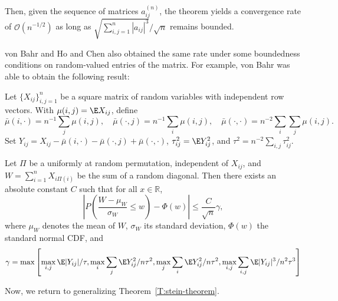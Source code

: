 Then, given the sequence of matrices $a_{ij}^{(n)}$, the theorem
yields a convergence rate of $\mathcal{O}(n^{-1/2})$ as long as
$\sqrt{\sum_{i, j = 1}^{n} |a_{ij}|^3} / \sqrt{n}$ remains bounded.

von Bahr \cite{bahr1976remainder} and Ho and Chen \cite{ho1978l_p}
also obtained the same rate under some boundedness conditions
on random-valued entries of the matrix.  For example, von
Bahr was able to obtain the following result:
\begin{theorem}
  Let $\{X_{ij}\}_{i, j = 1}^n$ be a square matrix of random variables with
  independent row vectors.
  With $\mu(i, j) = \E X_{ij}$, define
  \begin{equation*}
    \bar{\mu}(i, \cdot) = n^{-1} \sum_j \mu(i, j), \quad
    \bar{\mu}(\cdot, j) = n^{-1} \sum_i \mu(i, j), \quad
    \bar{\mu}(\cdot, \cdot) = n^{-2} \sum_i \sum_j \mu(i, j). \quad
  \end{equation*}
  Set $Y_{ij} = X_{ij} - \bar{\mu}(i, \cdot) - \bar{\mu}(\cdot, j) + \bar{\mu}(\cdot, \cdot)$,
  $\tau_{ij}^2 = \E Y_{ij}^2$, and $\tau^2 = n^{-2} \sum_{i, j} \tau_{ij}^2$.

  Let $\Pi$ be a uniformly at random permutation, independent of $X_{ij}$, and
  $W = \sum_{i=1}^n X_{i\Pi(i)}$ be the sum of a random diagonal.
  Then there exists an absolute constant $C$ such that for all $x \in \mathbb{R}$,
  \begin{equation*}
    \left |P \left (\frac{W - \mu_W}{\sigma_W} \leq w \right ) - \Phi(w) \right |
    \leq \frac{C}{\sqrt{n}} \gamma,
  \end{equation*}
  where $\mu_W$ denotes the mean of $W$, $\sigma_W$ its standard deviation,
  $\Phi(w)$ the standard normal CDF, and
  \begin{equation*}
    \gamma = \max \left [
      \max_{i, j} \E |Y_{ij}| / \tau,
      \max_i \sum_j \E Y_{ij}^2 / n \tau^2,
      \max_j \sum_i \E Y_{ij}^2 / n \tau^2,
      \max_{i, j} \sum_{i, j} \E |Y_{ij}|^3 / n^2 \tau^3
    \right ]
  \end{equation*}
\end{theorem}

Now, we return to generalizing Theorem~\ref{T:stein-theorem}.


